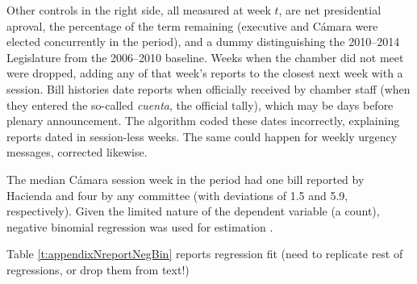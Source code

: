 \documentclass[letter,12pt]{article}
\begin{document}
Other controls in the right side, all measured at week $t$, are net presidential aproval, the percentage of the term remaining (executive and C\'amara were elected concurrently in the period), and a dummy distinguishing the 2010--2014 Legislature from the 2006--2010 baseline. Weeks when the chamber did not meet were dropped, adding any of that week's reports to the closest next week with a session. Bill histories date reports when officially received by chamber staff (when they entered the so-called \emph{cuenta}, the official tally), which may be days before plenary announcement. The algorithm coded these dates incorrectly, explaining reports dated in session-less weeks. The same could happen for weekly urgency messages, corrected likewise.

The median C\'amara session week in the period had one bill reported by Hacienda and four by any committee (with deviations of 1.5 and 5.9, respectively). Given the limited nature of the dependent variable (a count), negative binomial regression was used for estimation \citep{cameron.trivedi.1998}. 

Table \ref{t:appendixNreportNegBin} reports regression fit (need to replicate rest of regressions, or drop them from text!)
\end{document}
